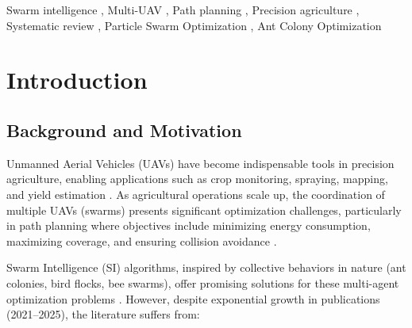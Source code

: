 \documentclass[review, 12pt, times]{elsarticle}
\begin{document}
\begin{frontmatter}
\begin{abstract}
\textbf{Conclusions:} Current research on SI-based multi-UAV
path planning in agriculture remains heavily
simulation-oriented and lacks standardized benchmarking
frameworks. This study provides the first structured gap
analysis for this domain and proposes a research agenda
emphasizing experimental validation, dynamic environment
modeling, and standardized evaluation metrics to accelerate
practical deployment of swarm-based agricultural UAV systems.
\end{abstract}

\begin{keyword}
Swarm intelligence \sep
Multi-UAV \sep
Path planning \sep
Precision agriculture \sep
Systematic review \sep
Particle Swarm Optimization \sep
Ant Colony Optimization
\end{keyword}

\end{frontmatter}

\section{Introduction}

\subsection{Background and Motivation}

Unmanned Aerial Vehicles (UAVs) have become indispensable
tools in precision agriculture, enabling applications such
as crop monitoring, spraying, mapping, and yield estimation
\cite{zhang2012,tsouros2019,puri2017,mogili2018,hunt2018}.
As agricultural operations scale up, the coordination of
multiple UAVs (swarms) presents significant optimization
challenges, particularly in path planning where objectives
include minimizing energy consumption, maximizing coverage,
and ensuring collision avoidance
\cite{chung2018,gupta2016,bekmezci2013,hayat2016}.

Swarm Intelligence (SI) algorithms, inspired by collective
behaviors in nature (ant colonies, bird flocks, bee swarms),
offer promising solutions for these multi-agent optimization
problems \cite{dorigo2006,kennedy1995,blum2008,yang2010,%
beni2005,bonabeau1999,yang2013}. However, despite
exponential growth in publications (2021--2025), the
literature suffers from:
\end{document}

